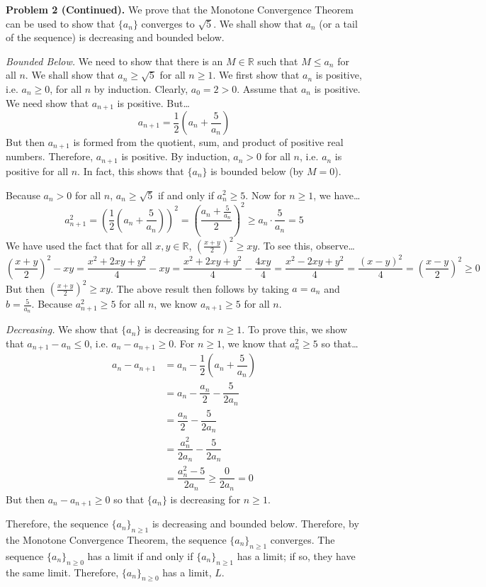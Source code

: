 \documentclass[11pt,letterpaper]{article}
\begin{document}
\newpage



{\bfseries Problem 2 (Continued).} We prove that the Monotone Convergence Theorem can be used to show that $\{ a_n \}$ converges to $\sqrt{5}$. We shall show that $a_n$ (or a tail of the sequence) is decreasing and bounded below. \pspace

{\itshape Bounded Below.} We need to show that there is an $M \in \mathbb{R}$ such that $M \leq a_n$ for all $n$. We shall show that $a_n \geq \sqrt{5}$ for all $n \geq 1$. We first show that $a_n$ is positive, i.e. $a_n \geq 0$, for all $n$ by induction. Clearly, $a_0= 2 > 0$. Assume that $a_n$ is positive. We need show that $a_{n+1}$ is positive. But\dots
	\[
	a_{n+1}= \dfrac{1}{2} \left( a_n + \dfrac{5}{a_n} \right)
	\]
But then $a_{n+1}$ is formed from the quotient, sum, and product of positive real numbers. Therefore, $a_{n+1}$ is positive. By induction, $a_n > 0$ for all $n$, i.e. $a_n$ is positive for all $n$. In fact, this shows that $\{ a_n \}$ is bounded below (by $M= 0$). \pspace

Because $a_n > 0$ for all $n$, $a_n \geq \sqrt{5}$ if and only if $a_n^2 \geq 5$. Now for $n \geq 1$, we have\dots
	\[
	a_{n+1}^2= \left( \dfrac{1}{2} \left(a_n + \dfrac{5}{a_n} \right) \right)^2= \left( \dfrac{a_n + \frac{5}{a_n}}{2} \right)^2 \geq a_n \cdot \dfrac{5}{a_n}= 5
	\]
We have used the fact that for all $x, y \in \mathbb{R}$, $\left( \frac{x + y}{2} \right)^2 \geq xy$. To see this, observe\dots
	\[
	\left( \dfrac{x + y}{2} \right)^2 - xy= \dfrac{x^2 + 2xy + y^2}{4} - xy= \dfrac{x^2 + 2xy + y^2}{4} - \dfrac{4xy}{4}= \dfrac{x^2 - 2xy + y^2}{4}= \dfrac{(x - y)^2}{4}= \left( \dfrac{x - y}{2} \right)^2 \geq 0
	\]
But then $\left( \frac{x + y}{2} \right)^2 \geq xy$. The above result then follows by taking $a= a_n$ and $b= \frac{5}{a_n}$. Because $a_{n+1}^2 \geq 5$ for all $n$, we know $a_{n+1} \geq 5$ for all $n$. \pspace

{\itshape Decreasing.} We show that $\{ a_n \}$ is decreasing for $n \geq 1$. To prove this, we show that $a_{n+1} - a_n \leq 0$, i.e. $a_n - a_{n+1} \geq 0$. For $n \geq 1$, we know that $a_n^2 \geq 5$ so that\dots
	\[
	\begin{aligned}
	a_n - a_{n+1}&= a_n - \dfrac{1}{2} \left( a_n + \dfrac{5}{a_n} \right) \\
	&= a_n - \dfrac{a_n}{2} - \dfrac{5}{2a_n} \\
	&= \dfrac{a_n}{2} - \dfrac{5}{2a_n} \\
	&= \dfrac{a_n^2}{2a_n} - \dfrac{5}{2a_n} \\
	&= \dfrac{a_n^2 - 5}{2a_n} \geq \dfrac{0}{2a_n} = 0
	\end{aligned}
	\]
But then $a_n - a_{n+1} \geq 0$ so that $\{ a_n \}$ is decreasing for $n \geq 1$. \pspace

Therefore, the sequence $\{ a_n \}_{n \geq 1}$ is decreasing and bounded below. Therefore, by the Monotone Convergence Theorem, the sequence $\{ a_n \}_{n \geq 1}$ converges. The sequence $\{ a_n \}_{n \geq 0}$ has a limit if and only if $\{ a_n \}_{n \geq 1}$ has a limit; if so, they have the same limit. Therefore, $\{ a_n \}_{n \geq 0}$ has a limit, $L$. 
\end{document}
